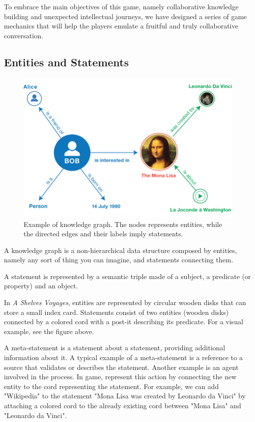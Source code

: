 \documentclass{article}
\begin{document}
\begin{multicols}{2}
To embrace the main objectives of this game, namely collaborative knowledge building and unexpected intellectual journeys, we have designed a series of game mechanics that will help the players emulate a fruitful and truly collaborative conversation.

\subsection{Entities and Statements}

\begin{figure}[H]
\centering
\includegraphics[scale=0.2]{figs/example-graph.jpg}
\caption{Example of knowledge graph. The nodes represents entities, while the directed edges and their labels imply statements.}
\end{figure}

A knowledge graph is a non-hierarchical data structure composed by entities, namely any sort of thing you can imagine, and statements connecting them.

A statement is represented by a semantic triple made of a subject, a predicate (or property) and an object. 

In \textit{A Shelves Voyages}, entities are represented by circular wooden disks that can store a small index card. Statements consist of two entities (wooden disks) connected by a colored cord with a post-it describing its predicate. For a visual example, see the figure above.

A meta-statement is a statement about a statement, providing additional information about it. A typical example of a meta-statement is a reference to a source that validates or describes the statement. Another example is an agent involved in the process. In game, represent this action by connecting the new entity to the cord representing the statement. For example, we can add "Wikipedia" to the statement "Mona Lisa was created by Leonardo da Vinci" by attaching a colored cord to the already existing cord between "Mona Lisa" and "Leonardo da Vinci".


\end{multicols}
\end{document}
